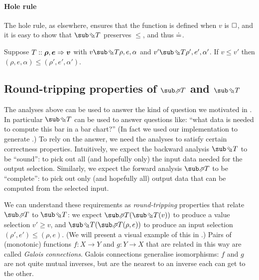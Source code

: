 \paragraph{Hole rule} The hole rule, as elsewhere, ensures that the function is defined when $v$ is $\square$, and it is easy to show that $\evalBwdF{T}$  preserves $\leq$, and thus $\doteq$.

\begin{lemma}
   Suppose $T :: \bm{\rho}, \bm{e} \Rightarrow \bm{v}$ with $v \evalBwdR{T} \rho, e, \alpha $ and $v' \evalBwdR{T} \rho', e', \alpha' $. If $v \leq v'$ then $(\rho, e, \alpha) \leq (\rho', e', \alpha')$.
\end{lemma}

\subsection{Round-tripping properties of $\evalFwdF{T}$ and $\evalBwdF{T}$}
\label{sec:data-dependencies:galois-connections}

The analyses above can be used to answer the kind of question we motivated in . In particular $\evalBwdF{T}$ can be used to answer questions like: ``what data is needed to compute this bar in a bar chart?'' (In fact we used our implementation to generate .) To rely on the answer, we need the analyses to satisfy certain correctness properties. Intuitively, we expect the backward analysis $\evalBwdF{T}$ to be ``sound'': to pick out all (and hopefully only) the input data needed for the output selection. Similarly, we expect the forward analysis $\evalFwdF{T}$ to be ``complete'': to pick out only (and hopefully all) output data that can be computed from the selected input. 

We can understand these requirements as \emph{round-tripping} properties that relate $\evalFwdF{T}$ to $\evalBwdF{T}$: we expect $\evalFwdF{T}(\evalBwdF{T}(v))$ to produce a value selection $v' \geq v$, and $\evalBwdF{T}(\evalFwdF{T}(\rho,e))$ to produce an input selection $(\rho',e') \leq (\rho,e)$. (We will present a visual example of this in .) Pairs of (monotonic) functions $f: X \to Y$ and $g: Y \to X$ that are related in this way are called \emph{Galois connections}. Galois connections generalise isomorphisms: $f$ and $g$ are not quite mutual inverses, but are the nearest to an inverse each can get to the other.


